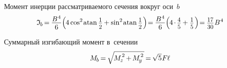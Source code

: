 \documentclass[14pt]{extarticle}
\newcommand\cosine{\operatorname{cos}}
\newcommand\sine{\operatorname{sin}}
\newcommand\atan{\operatorname{atan}}
\begin{document}
\vspace{.2em}
Момент инерции рассматриваемого сечения вокруг оси~$b$
\[
\mathfrak{I}_{\hspace{-0.1ex}\scalebox{.8}{$b$}} \hspace{-0.25ex}
=\hspace{-0.1ex}
\displaystyle\frac{\raisebox{-0.18em}{$B^{\hspace{.1ex}4}$}}{6} \Bigl(
\hspace{-0.1ex} 4 \cosine^{2} \hspace{-0.22ex} \atan \scalebox{.88}{$\displaystyle\frac{\raisebox{-0.2em}{$1$}}{2}$}
\hspace{-0.1ex}+
\sine^{2} \hspace{-0.22ex} \atan \scalebox{.88}{$\displaystyle\frac{\raisebox{-0.2em}{$1$}}{2}$} \hspace{.2ex}
\Bigr) \hspace{-.45ex}
= \hspace{-0.1ex}
\displaystyle\frac{\raisebox{-0.18em}{$B^{\hspace{.1ex}4}$}}{6} \Bigl(
\hspace{-0.1ex} 4 \hspace{-.2ex}\cdot\hspace{-.2ex} \scalebox{.88}{$ \displaystyle\frac{\raisebox{-0.18em}{$4$}}{5} $}
\hspace{-0.1ex}+
\scalebox{.88}{$ \displaystyle\frac{\raisebox{-0.18em}{$1$}}{5} $}
\hspace{.2ex} \Bigr) \hspace{-.45ex}
= \hspace{-0.1ex}
\scalebox{.88}{$ \displaystyle\frac{\raisebox{-0.18em}{$17$}}{30} $} \hspace{.1ex} B^{\hspace{.1ex}4}
\]

Суммарный изгибающий момент в~сечении
\[
M_{\hspace{-0.1ex}\scalebox{.8}{$b$}} \hspace{-0.2ex}
=\hspace{-.2ex} \sqrt{\hspace{-0.2ex}M_{\hspace{-0.1ex}\scalebox{.8}{$z$}}^{\hspace{.2ex}\raisebox{.2em}{$\scriptstyle 2$}} \hspace{-0.2ex}+\hspace{-0.2ex} M_{\hspace{-0.1ex}\scalebox{.8}{$y$}}^{\hspace{.2ex}\raisebox{.2em}{$\scriptstyle 2$}}\hspace{.2ex}} \hspace{-.25ex}
=\hspace{-.2ex} \sqrt{5} \hspace{.1ex} F \hspace{-0.1ex} \ell
\]
\end{document}
